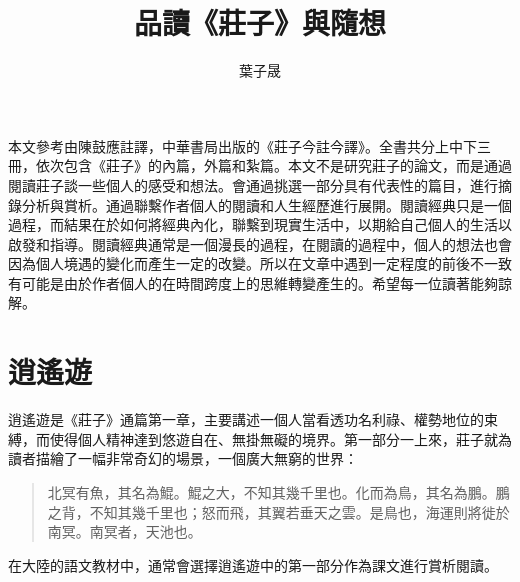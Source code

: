 \documentclass[12pt,a4paper]{article}
\begin{document}
\begin{CJK*}{UTF8}{bsmi}
    
    \title{品讀《莊子》與隨想}
    \author{葉子晟}
    \date{}
    \maketitle
    
    \small
    本文參考由陳鼓應註譯，中華書局出版的《莊子今註今譯》。全書共分上中下三冊，依次包含《莊子》的內篇，外篇和紮篇。本文不是研究莊子的論文，而是通過閱讀莊子談一些個人的感受和想法。會通過挑選一部分具有代表性的篇目，進行摘錄分析與賞析。通過聯繫作者個人的閱讀和人生經歷進行展開。閱讀經典只是一個過程，而結果在於如何將經典內化，聯繫到現實生活中，以期給自己個人的生活以啟發和指導。閱讀經典通常是一個漫長的過程，在閱讀的過程中，個人的想法也會因為個人境遇的變化而產生一定的改變。所以在文章中遇到一定程度的前後不一致有可能是由於作者個人的在時間跨度上的思維轉變產生的。希望每一位讀著能夠諒解。

    \normalsize

    \section{逍遙遊}
    逍遙遊是《莊子》通篇第一章，主要講述一個人當看透功名利祿、權勢地位的束縛，而使得個人精神達到悠遊自在、無掛無礙的境界。第一部分一上來，莊子就為讀者描繪了一幅非常奇幻的場景，一個廣大無窮的世界：
    \begin{quotation}
        北冥有魚，其名為鯤。鯤之大，不知其幾千里也。化而為鳥，其名為鵬。鵬之背，不知其幾千里也；怒而飛，其翼若垂天之雲。是鳥也，海運則將徙於南冥。南冥者，天池也。
    \end{quotation}
    在大陸的語文教材中，通常會選擇逍遙遊中的第一部分作為課文進行賞析閱讀。


\end{CJK*}
\end{document}
